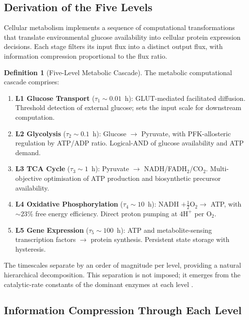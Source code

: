 \documentclass[11pt,twocolumn,a4paper]{article}
\theoremstyle{definition}
\newtheorem{definition}[theorem]{Definition}
\theoremstyle{remark}
\begin{document}
\subsection{Derivation of the Five Levels}

Cellular metabolism implements a sequence of computational
transformations that translate environmental glucose availability
into cellular protein expression decisions. Each stage filters its
input flux into a distinct output flux, with information compression
proportional to the flux ratio.

\begin{definition}[Five-Level Metabolic Cascade]
\label{def:cascade}
The metabolic computational cascade comprises:
\begin{enumerate}
\item \textbf{L1 Glucose Transport} ($\tau_1 \sim 0.01$~h):
GLUT-mediated facilitated diffusion. Threshold detection of external
glucose; sets the input scale for downstream computation.
\item \textbf{L2 Glycolysis} ($\tau_2 \sim 0.1$~h): Glucose
$\to$ Pyruvate, with PFK-allosteric regulation by ATP/ADP ratio.
Logical-AND of glucose availability and ATP demand.
\item \textbf{L3 TCA Cycle} ($\tau_3 \sim 1$~h): Pyruvate
$\to$ NADH/FADH$_2$/CO$_2$. Multi-objective optimisation of ATP
production and biosynthetic precursor availability.
\item \textbf{L4 Oxidative Phosphorylation} ($\tau_4 \sim 10$~h):
NADH $+ \tfrac{1}{2} \mathrm{O}_2 \to$ ATP, with $\sim 23\%$ free
energy efficiency. Direct proton pumping at $4 \mathrm{H}^+$ per
$\mathrm{O}_2$.
\item \textbf{L5 Gene Expression} ($\tau_5 \sim 100$~h): ATP and
metabolite-sensing transcription factors $\to$ protein synthesis.
Persistent state storage with hysteresis.
\end{enumerate}
\end{definition}

The timescales separate by an order of magnitude per level, providing
a natural hierarchical decomposition. This separation is not imposed;
it emerges from the catalytic-rate constants of the dominant enzymes
at each level \citep{newgard2017, halestrap2013, wallace2013}.

\subsection{Information Compression Through Each Level}
\end{document}
